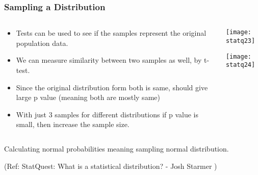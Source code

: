 \begin{frame}[fragile]\frametitle{Sampling a Distribution}
\begin{columns}
    \begin{column}[T]{0.6\linewidth}
	\begin{itemize}
	\item Tests can be used to see if the samples represent the original population data.
	\item We can measure similarity between two samples as well, by t-test.
	\item Since the original distribution form both is same, should give large p value (meaning both are mostly same)
	\item With just 3 samples for different distributions if p value is small, then increase the sample size.
	\end{itemize}

    \end{column}
    \begin{column}[T]{0.4\linewidth}
      \begin{center}
      \texttt{[image: statq23]}
	  
	  \texttt{[image: statq24]}
	   
	  	\end{center}
    \end{column}

  \end{columns}
  
 Calculating normal probabilities meaning sampling normal distribution.
 
\tiny{(Ref: StatQuest: What is a statistical distribution? - Josh Starmer )}
\end{frame}



